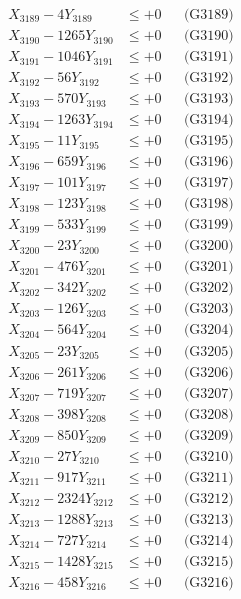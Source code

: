 \documentclass[a4paper,10pt]{article}
\begin{document}
{\begin{align}
X_{3189} - 4Y_{3189} &\leq +0 && \text{(G3189)} \\
X_{3190} - 1265Y_{3190} &\leq +0 && \text{(G3190)} \\
\allowbreak
X_{3191} - 1046Y_{3191} &\leq +0 && \text{(G3191)} \\
X_{3192} - 56Y_{3192} &\leq +0 && \text{(G3192)} \\
X_{3193} - 570Y_{3193} &\leq +0 && \text{(G3193)} \\
X_{3194} - 1263Y_{3194} &\leq +0 && \text{(G3194)} \\
X_{3195} - 11Y_{3195} &\leq +0 && \text{(G3195)} \\
X_{3196} - 659Y_{3196} &\leq +0 && \text{(G3196)} \\
X_{3197} - 101Y_{3197} &\leq +0 && \text{(G3197)} \\
X_{3198} - 123Y_{3198} &\leq +0 && \text{(G3198)} \\
X_{3199} - 533Y_{3199} &\leq +0 && \text{(G3199)} \\
X_{3200} - 23Y_{3200} &\leq +0 && \text{(G3200)} \\
\allowbreak
X_{3201} - 476Y_{3201} &\leq +0 && \text{(G3201)} \\
X_{3202} - 342Y_{3202} &\leq +0 && \text{(G3202)} \\
X_{3203} - 126Y_{3203} &\leq +0 && \text{(G3203)} \\
X_{3204} - 564Y_{3204} &\leq +0 && \text{(G3204)} \\
X_{3205} - 23Y_{3205} &\leq +0 && \text{(G3205)} \\
X_{3206} - 261Y_{3206} &\leq +0 && \text{(G3206)} \\
X_{3207} - 719Y_{3207} &\leq +0 && \text{(G3207)} \\
X_{3208} - 398Y_{3208} &\leq +0 && \text{(G3208)} \\
X_{3209} - 850Y_{3209} &\leq +0 && \text{(G3209)} \\
X_{3210} - 27Y_{3210} &\leq +0 && \text{(G3210)} \\
\allowbreak
X_{3211} - 917Y_{3211} &\leq +0 && \text{(G3211)} \\
X_{3212} - 2324Y_{3212} &\leq +0 && \text{(G3212)} \\
X_{3213} - 1288Y_{3213} &\leq +0 && \text{(G3213)} \\
X_{3214} - 727Y_{3214} &\leq +0 && \text{(G3214)} \\
X_{3215} - 1428Y_{3215} &\leq +0 && \text{(G3215)} \\
X_{3216} - 458Y_{3216} &\leq +0 && \text{(G3216)} \\

\end{align}}
\end{document}
